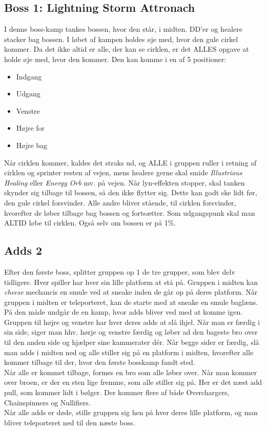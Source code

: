 \subsection*{Boss 1: Lightning Storm Attronach}
I denne boss-kamp tankes bossen, hvor den står, i midten. DD'er og healere
stacker bag bossen. I løbet af kampen holdes øje med, hvor den gule cirkel
kommer. Da det ikke altid er alle, der kan se cirklen, er det ALLES opgave at
holde øje med, hvor den kommer. Den kan komme i en af 5 positioner:
\begin{itemize}
  \item Indgang
  \item Udgang
  \item Venstre
  \item Højre for
  \item Højre bag
\end{itemize}
Når cirklen kommer, kaldes det straks ud, og ALLE i gruppen ruller i retning af
cirklen og sprinter resten af vejen, mens healere gerne skal smide
\emph{Illustrious Healing} eller \emph{Energy Orb} mv. på vejen. Når
lyn-effekten stopper, skal tanken skynder sig tilbage til bossen, så den ikke
flytter sig. Dette kan godt ske lidt før, den gule cirkel forsvinder. Alle
andre bliver stående, til cirklen forsvinder, hvorefter de løber tilbage bag
bossen og fortsætter. Som udgangspunk skal man ALTID løbe til cirklen. Også
selv om bossen er på 1\%.
\subsection*{Adds 2}
Efter den første boss, splitter gruppen op 1 de tre grupper, som blev delv
tidligere. Hver spiller har hver sin lille platform at stå på. Gruppen i midten
kan \emph{cheese} mechancis en smule ved at sneake inden de går op på deres
platform. 
Når gruppen i midten er teleporteret, kan de starte med at sneake en smule
baglæns. På den måde undgår de en kamp, hvor adds bliver ved med at komme
igen.\\
Gruppen til højre og venstre har hver deres adds at slå ihjel. Når man er
færdig i sin side, siger man hhv. hørje og venstre færdig og løber ad den
bageste bro over til den anden side og hjælper sine kammerater dér. Når begge
sider er færdig, slå man adds i midten ned og alle stiller sig på en platform i
midten, hvorefter alle kommer tilbage til der, hvor den første bosskamp fandt
sted.\\
Når alle er kommet tilbage, formes en bro som alle løber over.
Når man kommer over broen, er der en sten lige fremme, som alle stiller sig på.
Her er det næst add pull, som kommer lidt i bølger. Der kommer flere af både
Overchargers, Chainspinners og Nullifiers.\\
Når alle adds er døde, stille gruppen sig hen på hver deres lille platform, og
man bliver teleporteret ned til den næste boss.
